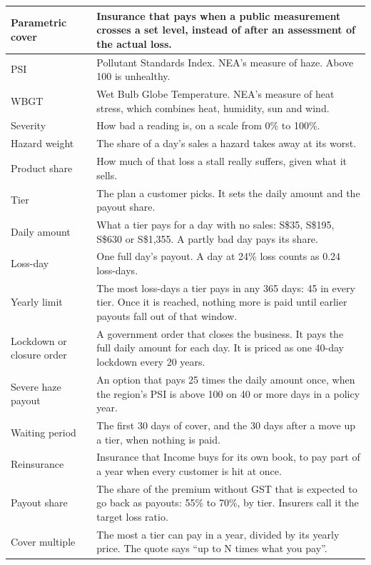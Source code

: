 \documentclass[11pt,a4paper]{article}
\newcommand{\sgd}{\textup{S\$}}
\begin{document}
{\small
\begin{xltabular}{\textwidth}{|K{3.6cm}|Y|}
\hline
Parametric cover & Insurance that pays when a public measurement crosses a set level, instead of after an assessment of the actual loss. \\
\hline
PSI & Pollutant Standards Index. NEA's measure of haze. Above 100 is unhealthy. \\
\hline
WBGT & Wet Bulb Globe Temperature. NEA's measure of heat stress, which combines heat, humidity, sun and wind. \\
\hline
Severity & How bad a reading is, on a scale from 0\% to 100\%. \\
\hline
Hazard weight & The share of a day's sales a hazard takes away at its worst. \\
\hline
Product share & How much of that loss a stall really suffers, given what it sells. \\
\hline
Tier & The plan a customer picks. It sets the daily amount and the payout share. \\
\hline
Daily amount & What a tier pays for a day with no sales: \sgd 35, \sgd 195, \sgd 630 or \sgd 1,355. A partly bad day pays its share. \\
\hline
Loss-day & One full day's payout. A day at 24\% loss counts as 0.24 loss-days. \\
\hline
Yearly limit & The most loss-days a tier pays in any 365 days: 45 in every tier. Once it is reached, nothing more is paid until earlier payouts fall out of that window. \\
\hline
Lockdown or closure order & A government order that closes the business. It pays the full daily amount for each day. It is priced as one 40-day lockdown every 20 years. \\
\hline
Severe haze payout & An option that pays 25 times the daily amount once, when the region's PSI is above 100 on 40 or more days in a policy year. \\
\hline
Waiting period & The first 30 days of cover, and the 30 days after a move up a tier, when nothing is paid. \\
\hline
Reinsurance & Insurance that Income buys for its own book, to pay part of a year when every customer is hit at once. \\
\hline
Payout share & The share of the premium without GST that is expected to go back as payouts: 55\% to 70\%, by tier. Insurers call it the target loss ratio. \\
\hline
Cover multiple & The most a tier can pay in a year, divided by its yearly price. The quote says ``up to N times what you pay''. \\

\end{xltabular}}
\end{document}
